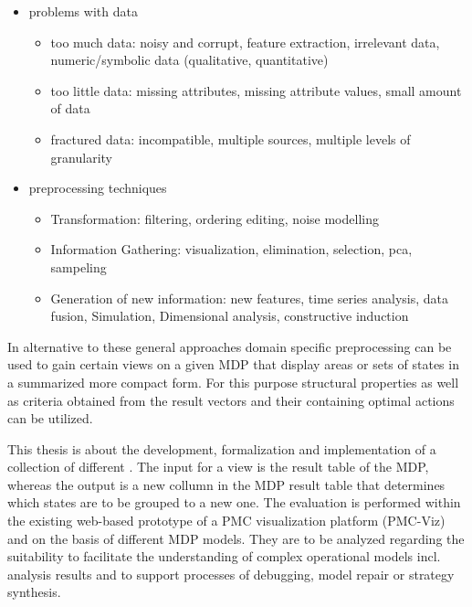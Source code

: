 \documentclass[preview]{standalone}
\begin{document}
\begin{itemize}
\begin{itemize}
			\end{itemize}
			\item problems with data
			\begin{itemize}
				\item too much data: noisy and corrupt, feature extraction, irrelevant data, numeric/symbolic data (qualitative, quantitative)
				\item too little data: missing attributes, missing attribute values, small amount of data
				\item fractured data: incompatible, multiple sources, multiple levels of granularity
			\end{itemize}
			\item preprocessing techniques 
			\begin{itemize}
				\item Transformation: filtering, ordering editing, noise modelling
				\item Information Gathering: visualization, elimination, selection, pca, sampeling
				\item Generation of new information: new features, time series analysis, data fusion, Simulation, Dimensional analysis, constructive induction
			\end{itemize}
		\end{itemize}
		
		In alternative to these general approaches domain specific preprocessing can be used to gain certain views on a given MDP that display areas or sets of states in a summarized more compact form. For this purpose structural properties as well as criteria obtained from the result vectors and their containing optimal actions can be utilized.
		
		
		This thesis is about the development, formalization and implementation of a collection of different \emph{\viewsN}.
		The input for a view is the result table of the MDP, whereas the output is a new collumn in the MDP result table that determines which states are to be grouped to a new one.
		The evaluation is performed within the existing web-based prototype of a PMC visualization platform (PMC-Viz) and on the basis of different MDP models. They are to be analyzed regarding the suitability to facilitate the understanding of complex operational models incl. analysis results and to support processes of debugging, model repair or strategy synthesis.
		
\end{document}
